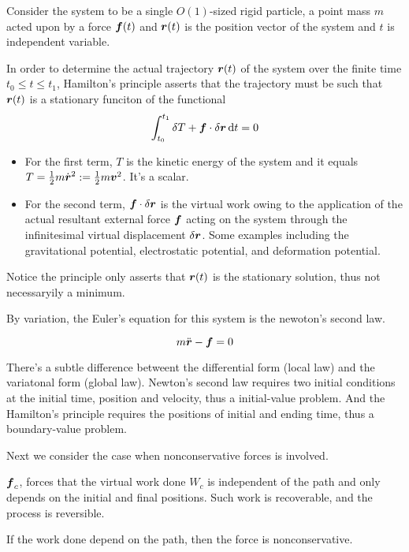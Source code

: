 \documentclass{article}
\begin{document}
Consider the system to be a single \(O(1)\)-sized rigid particle, a point mass \(m\) acted upon by a force \(\boldsymbol{f}(t)\) and \(\boldsymbol{r}(t)\) is the position vector of the system and \(t\) is independent variable.

\begin{theorem}
    In order to determine the actual trajectory \(\boldsymbol{r}(t)\) of the system over the finite time \(t_0\leq t\leq t_1\), Hamilton's principle asserts that the trajectory must be such that \(\boldsymbol{r}(t)\) is a stationary funciton of the functional
    \[\int_{t_0}^{t_1} \delta T+\boldsymbol{f}\cdot\delta \boldsymbol{r} \,\mathrm{d} t=0\]

    \begin{itemize}
        \item For the first term, \(T\) is the kinetic energy of the system and it equals \(T=\frac{1}{2}m\dot {\boldsymbol{r}}^2:=\frac{1}{2} m\boldsymbol{v}^2\). It's a scalar.
        \item For the second term, \(\boldsymbol{f}\cdot\delta \boldsymbol{r} \) is the virtual work owing to the application of the actual resultant external force \(\boldsymbol{f}\) acting on the system through the infinitesimal virtual displacement \(\delta\boldsymbol{r}\). Some examples including the gravitational potential, electrostatic potential, and deformation potential.
    \end{itemize}
\end{theorem}

\begin{remark}
    Notice the principle only asserts that \(\boldsymbol{r}(t)\) is the stationary solution, thus not necessaryily a minimum.
\end{remark}


By variation, the Euler's equation for this system is the newoton's second law.

\[m\ddot {\boldsymbol{r}}-\boldsymbol{f}=0\]

\begin{remark}
    There's a subtle difference betweent the differential form (local law) and the variatonal form (global law). Newton's second law requires two initial conditions at the initial time, position and velocity, thus a initial-value problem. And the Hamilton's principle requires the positions of initial and ending time, thus a boundary-value problem.
\end{remark}

Next we consider the case when nonconservative forces is involved. 

\begin{definition}
    \(\boldsymbol{f}_c\), forces that the virtual work done \(W_c\) is independent of the path and only depends on the initial and final positions. Such work is recoverable, and the process is reversible.

    If the work done depend on the path, then the force is nonconservative.
\end{definition}
\end{document}
